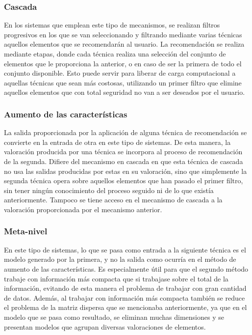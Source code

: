 \subsubsection{Cascada}
En los sistemas que emplean este tipo de mecanismos, se realizan filtros progresivos en los que se van seleccionando y filtrando mediante varias técnicas aquellos elementos que se recomendarán al usuario. La recomendación se realiza mediante etapas, donde cada técnica realiza una selección del conjunto de elementos que le proporciona la anterior, o en caso de ser la primera de todo el conjunto disponible. Esto puede servir para liberar de carga computacional a aquellas técnicas que sean más costosas, utilizando un primer filtro que elimine aquellos elementos que con total seguridad no van a ser deseados por el usuario.

\subsubsection{Aumento de las características}
La salida proporcionada por la aplicación de alguna técnica de recomendación se convierte en la entrada de otra en este tipo de sistemas\cite{Sarwar:1998:UFA:289444.289509}. De esta manera, la valoración producida por una técnica se incorpora al proceso de recomendación de la segunda. Difiere del mecanismo en cascada en que esta técnica de cascada no usa las salidas producidas por estas en su valoración, sino que simplemente la segunda técnica opera sobre aquellos elementos que han pasado el primer filtro, sin tener ningún conocimiento del proceso seguido ni de lo que existía anteriormente. Tampoco se tiene acceso en el mecanismo de cascada a la valoración proporcionada por el mecanismo anterior.

\subsubsection{Meta-nivel}
En este tipo de sistemas\cite{Balabanovic:1997:FCC:245108.245124}, lo que se pasa como entrada a la siguiente técnica es el modelo generado por la primera, y no la salida como ocurría en el método de aumento de las características. Es especialmente útil para que el segundo método trabaje con información más compacta que si trabajase sobre el total de la información, evitando de esta manera el problema de trabajar con gran cantidad de datos. Además, al trabajar con información más compacta también se reduce el problema de la matriz dispersa que se mencionaba anteriormente, ya que en el modelo que se pasa como resultado, se eliminan muchas dimensiones y se presentan modelos que agrupan diversas valoraciones de elementos.



